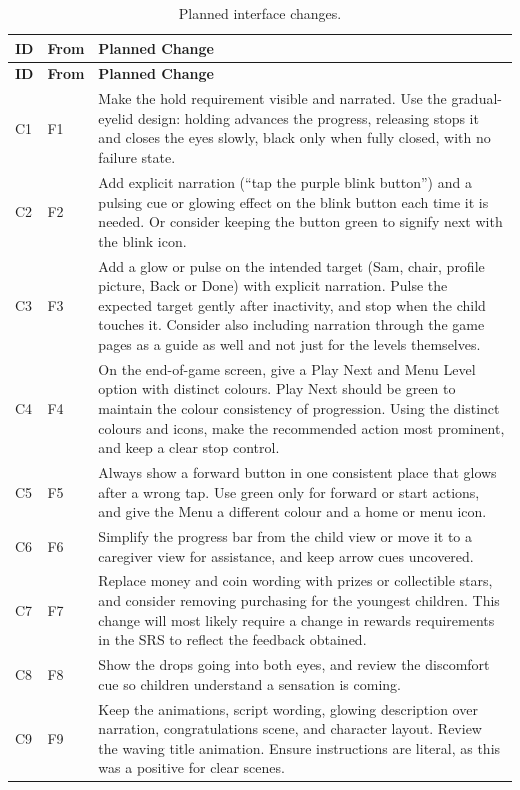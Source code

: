 \documentclass{article}
\begin{document}
{\small
\begin{longtable}{@{}>{\raggedright\arraybackslash}p{0.9cm} >{\raggedright\arraybackslash}p{1.0cm} >{\raggedright\arraybackslash}p{\dimexpr\linewidth-6.2cm-6\tabcolsep\relax}@{}}
\caption{Planned interface changes.}
\label{tab:changes}\\
\toprule
\textbf{ID} & \textbf{From} & \textbf{Planned Change} \\
\midrule
\endfirsthead
\toprule
\textbf{ID} & \textbf{From} & \textbf{Planned Change} \\
\midrule
\endhead
\bottomrule
\endlastfoot
C1 & F1 &
  Make the hold requirement visible and narrated. Use the gradual-eyelid design: holding advances the progress, releasing 
  stops it and closes the eyes slowly, black only when fully closed, with no failure state. \\
C2 & F2 &
  Add explicit narration (``tap the purple blink button'') and a pulsing cue or glowing effect on the blink button each time 
  it is needed. Or consider keeping the button green to signify next with the blink icon. \\
C3 & F3 &
  Add a glow or pulse on the intended target (Sam, chair, profile picture, Back or Done) with explicit narration. Pulse the 
  expected target gently after inactivity, and stop when the child touches it. Consider also including narration through the 
  game pages as a guide as well and not just for the levels themselves. \\
C4 & F4 &
  On the end-of-game screen, give a Play Next and Menu Level option with distinct colours. Play Next should be green to maintain the 
  colour consistency of progression. Using the distinct colours and icons, make the recommended action 
  most prominent, and keep a clear stop control. \\
C5 & F5 &
  Always show a forward button in one consistent place that glows after a wrong tap. Use green only for forward or start 
  actions, and give the Menu a different colour and a home or menu icon. \\
C6 & F6 &
  Simplify the progress bar from the child view or move it to a caregiver view for assistance, and keep arrow cues uncovered. \\
C7 & F7 &
  Replace money and coin wording with prizes or collectible stars, and consider removing purchasing for the youngest 
  children. This change will most likely require a change in rewards requirements in the SRS to reflect the feedback 
  obtained. \\
C8 & F8 &
  Show the drops going into both eyes, and review the discomfort cue so children understand a sensation is coming. \\
C9 & F9 &
  Keep the animations, script wording, glowing description over narration, congratulations scene, and character layout. 
  Review the waving title animation. Ensure instructions are literal, as this was a positive for clear scenes. \\
\end{longtable}
}
\end{document}
